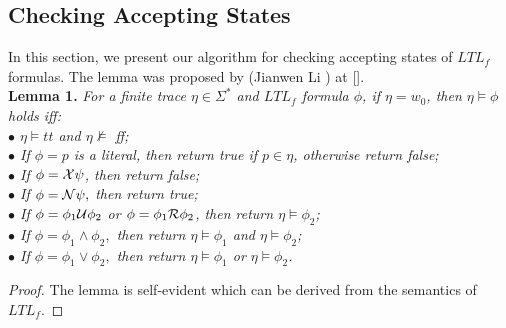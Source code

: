 \subsection{Checking Accepting States}  
In this section, we present our algorithm for checking accepting states of $LTL_f$ formulas. The lemma  was proposed by (Jianwen Li ) at [].  \\

{\bf Lemma 1.}  {\it For a finite trace $\eta \in \Sigma^{*}$ and $LTL_f$ formula $\phi$, if $\eta = w_0$, then $\eta \models \phi$ holds iff: \\ 
$\bullet$ $\eta \models tt$ and $\eta \not \models $ ff;\\
$\bullet$ If $\phi=p$ is a literal, then return true if $p \in \eta$, otherwise return false;\\
$\bullet$ If $\phi=\mathcal{X} \psi$, then return false;\\
$\bullet$ If $\phi=\mathcal{N} \psi,$ then return true;\\
$\bullet$ If $\phi=\phi_{1} \mathcal{U} \phi_{2}$ or  $\phi=\phi_{1} \mathcal{R} \phi_{2}$, then return  $\eta \models \phi_{2}$; \\
$\bullet$ If $\phi=\phi_{1} \wedge \phi_{2},$ then return $\eta \models \phi_{1}$ and $\eta \models \phi_{2}$; \\
$\bullet$ If $\phi=\phi_{1} \vee \phi_{2},$ then return $\eta \models \phi_{1}$ or $\eta \models \phi_{2}$.}

\begin{proof}
The lemma is self-evident which can be derived from the semantics of $LTL_f$.
\end{proof}

